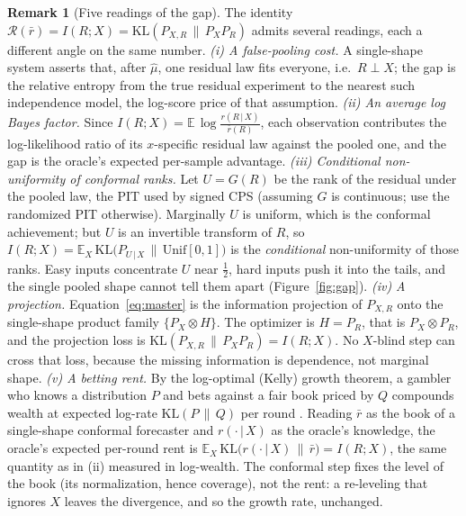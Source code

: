 \documentclass[10pt]{article} %
\theoremstyle{definition}
\newtheorem{remark}{Remark}
\newcommand{\E}{\mathbb{E}}
\newcommand{\KL}{\mathrm{KL}}
\newcommand{\given}{\,\vert\,}
\begin{document}
\begin{remark}[Five readings of the gap]\label{rem:readings}
The identity $\mathcal{R}(\bar r)=I(R;X)=\KL(P_{X,R}\,\|\,P_X P_R)$ admits several readings, each a
different angle on the same number.
\emph{(i) A false-pooling cost.} A single-shape system asserts that, after $\hat\mu$, one
residual law fits everyone, i.e.\ $R\perp X$; the gap is the relative entropy from the true
residual experiment to the nearest such independence model, the log-score price of that
assumption.
\emph{(ii) An average log Bayes factor.} Since
$I(R;X)=\E\,\log\frac{r(R\given X)}{\bar r(R)}$, each observation contributes the
log-likelihood ratio of its $x$-specific residual law against the pooled one, and the gap is
the oracle's expected per-sample advantage.
\emph{(iii) Conditional non-uniformity of conformal ranks.} Let $U=G(R)$ be the rank of the
residual under the pooled law, the PIT used by signed CPS (assuming $G$ is continuous; use the
randomized PIT otherwise). Marginally $U$ is uniform, which
is the conformal achievement; but $U$ is an invertible transform of $R$, so
$I(R;X)=\E_X\,\KL\!\big(P_{U\given X}\,\|\,\mathrm{Unif}[0,1]\big)$ is the \emph{conditional}
non-uniformity of those ranks. Easy inputs concentrate $U$ near $\tfrac12$, hard inputs push
it into the tails, and the single pooled shape cannot tell them apart (Figure~\ref{fig:gap}).
\emph{(iv) A projection.} Equation~\eqref{eq:master} is the information projection of
$P_{X,R}$ onto the single-shape product family $\{P_X\otimes H\}$. The optimizer is $H=P_R$,
that is $P_X\otimes P_R$, and the projection loss is $\KL(P_{X,R}\,\|\,P_X P_R)=I(R;X)$. No
$X$-blind step can cross that loss, because the missing information is dependence, not
marginal shape.
\emph{(v) A betting rent.} By the log-optimal (Kelly) growth theorem, a gambler who knows a
distribution $P$ and bets against a fair book priced by $Q$ compounds wealth at expected
log-rate $\KL(P\,\|\,Q)$ per round \citep{kelly1956new,cover2006elements}. Reading $\bar r$ as
the book of a single-shape conformal forecaster and $r(\cdot\given X)$ as the oracle's
knowledge, the oracle's expected per-round rent is $\E_X\,\KL\big(r(\cdot\given X)\,\|\,\bar
r\big)=I(R;X)$, the same quantity as in (ii) measured in log-wealth. The conformal step fixes
the level of the book (its normalization, hence coverage), not the rent: a re-leveling that
ignores $X$ leaves the divergence, and so the growth rate, unchanged.
\end{remark}
\end{document}
